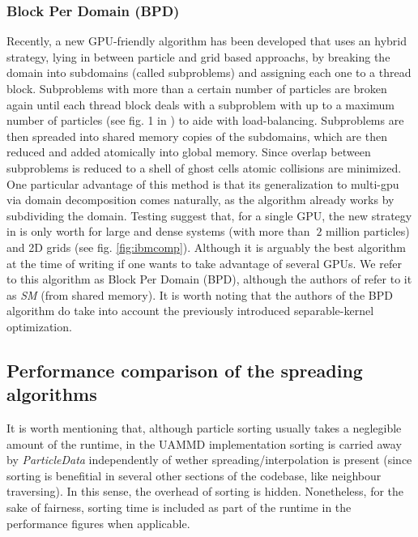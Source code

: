 \documentclass[ twoside,openright,titlepage,numbers=noenddot,%
headinclude,footinclude,cleardoublepage=empty,abstract=on,
BCOR=5mm,paper=a4,fontsize=11pt, dvipsnames
]{scrreprt}
\newcommand{\uammd}{\gls{UAMMD}\xspace}
\newcommand{\gpu}{\gls{GPU}\xspace}
\begin{document}
\subsubsection*{Block Per Domain (BPD)}
Recently, a new \gpu-friendly algorithm has been developed\cite{Shih2021} that uses an hybrid strategy, lying in between particle and grid based approachs, by breaking the domain into subdomains (called subproblems) and assigning each one to a thread block. Subproblems with more than a certain number of particles are broken again until each thread block deals with a subproblem with up to a maximum number of particles (see fig. 1 in \cite{Shih2021}) to aide with load-balancing. Subproblems are then spreaded into shared memory copies of the subdomains, which are then reduced and added atomically into global memory. Since overlap between subproblems is reduced to a shell of ghost cells atomic collisions are minimized. One particular advantage of this method is that its generalization to multi-gpu via domain decomposition comes naturally, as the algorithm already works by subdividing the domain. Testing suggest that, for a single \gpu, the new strategy in \cite{Shih2021} is only worth for large and dense systems (with more than $~2$ million particles) and 2D grids (see fig. \ref{fig:ibmcomp}). Although it is arguably the best algorithm at the time of writing if one wants to take advantage of several GPUs.
We refer to this algorithm as Block Per Domain (BPD), although the authors of \cite{Shih2021} refer to it as \emph{SM} (from shared memory). It is worth noting that the authors of the BPD algorithm do take into account the previously introduced separable-kernel optimization.

\subsection*{Performance comparison of the spreading algorithms}
It is worth mentioning that, although particle sorting usually takes a neglegible amount of the runtime, in the \uammd implementation sorting is carried away by \emph{ParticleData} independently of wether spreading/interpolation is present (since sorting is benefitial in several other sections of the codebase, like neighbour traversing). In this sense, the overhead of sorting is hidden. Nonetheless, for the sake of fairness, sorting time is included as part of the runtime in the performance figures when applicable.
\end{document}
